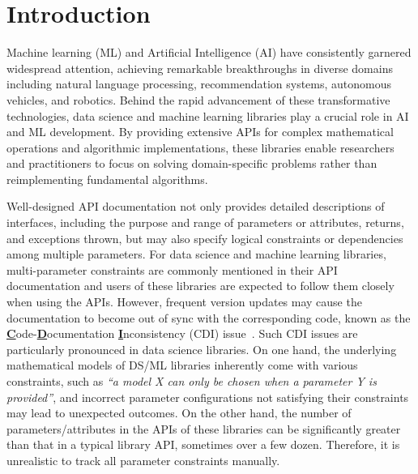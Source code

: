 \section{Introduction}\label{sec:introduction-mpchecker}

Machine learning (ML) and Artificial Intelligence (AI) have consistently garnered widespread
attention, achieving remarkable breakthroughs in diverse domains including natural language
processing, recommendation systems, autonomous vehicles, and robotics.
Behind the rapid advancement of these transformative technologies, data science and machine
learning libraries play a crucial role in AI and ML development.
By providing extensive APIs for complex mathematical operations and algorithmic implementations,
these libraries enable researchers and practitioners to focus on solving domain-specific problems
rather than reimplementing fundamental algorithms.

Well-designed API documentation not only provides detailed descriptions of interfaces,
including the purpose and range of parameters or attributes, returns, and exceptions thrown, but may also specify logical constraints or dependencies among multiple parameters.
For data science and machine learning libraries, multi-parameter constraints are commonly mentioned
in their API documentation and users of these libraries are expected to follow them closely when
using the APIs.
However, frequent version updates may cause the documentation to become out of sync with the corresponding
code, known as the \underline{\textbf{C}}ode-\underline{\textbf{D}}ocumentation
\underline{\textbf{I}}nconsistency (CDI) issue~\cite{aghajani2019software, rai2022review}.
Such CDI issues are particularly pronounced in data science libraries.
On one hand, the underlying mathematical models of DS/ML libraries inherently come with various
constraints, such as \emph{``a model X can only be chosen when a parameter Y is provided''}, and
incorrect parameter configurations not satisfying their constraints may lead to unexpected outcomes.
On the other hand, the number of parameters/attributes in the APIs of these libraries can be significantly greater
than that in a typical library API, sometimes over a few dozen.
Therefore, it is unrealistic to track all parameter constraints manually.

